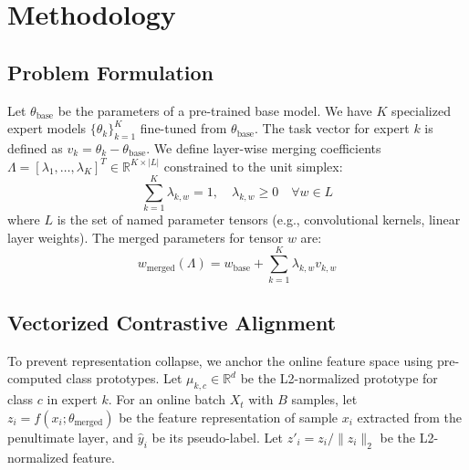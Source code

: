 \documentclass{article}
\theoremstyle{plain}
\theoremstyle{definition}
\theoremstyle{remark}
\begin{document}
\section{Methodology}
\label{sec:method}

\subsection{Problem Formulation}
Let $\theta_{\text{base}}$ be the parameters of a pre-trained base model. We have $K$ specialized expert models $\{\theta_k\}_{k=1}^K$ fine-tuned from $\theta_{\text{base}}$. The task vector for expert $k$ is defined as $v_k = \theta_k - \theta_{\text{base}}$. We define layer-wise merging coefficients $\Lambda = [\lambda_1, \dots, \lambda_K]^T \in \mathbb{R}^{K \times |L|}$ constrained to the unit simplex:
\begin{equation}
\sum_{k=1}^K \lambda_{k,w} = 1, \quad \lambda_{k,w} \geq 0 \quad \forall w \in L
\end{equation}
where $L$ is the set of named parameter tensors (e.g., convolutional kernels, linear layer weights). The merged parameters for tensor $w$ are:
\begin{equation}
w_{\text{merged}}(\Lambda) = w_{\text{base}} + \sum_{k=1}^K \lambda_{k,w} v_{k,w}
\end{equation}

\subsection{Vectorized Contrastive Alignment}
To prevent representation collapse, we anchor the online feature space using pre-computed class prototypes. Let $\mu_{k,c} \in \mathbb{R}^d$ be the L2-normalized prototype for class $c$ in expert $k$. For an online batch $X_t$ with $B$ samples, let $z_i = f(x_i; \theta_{\text{merged}})$ be the feature representation of sample $x_i$ extracted from the penultimate layer, and $\hat{y}_i$ be its pseudo-label. Let $z'_i = z_i / \|z_i\|_2$ be the L2-normalized feature.
\end{document}
